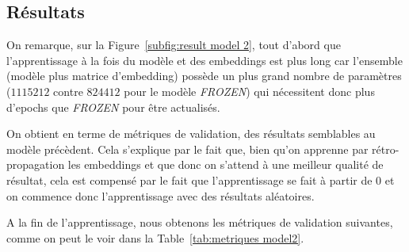 \documentclass[a4paper]{article}
\begin{document}
\subsection{Résultats}


On remarque, sur la Figure~\ref{subfig:result model 2}, tout d'abord que l'apprentissage à la fois du modèle et des embeddings est plus 
long car l'ensemble (modèle plus matrice d'embedding) possède un plus grand nombre de paramètres ($1115212$ contre $824412$ pour le 
modèle \textit{FROZEN}) qui nécessitent donc plus d'epochs que \textit{FROZEN} pour être actualisés.

On obtient en terme de métriques de validation, des résultats semblables au modèle précèdent. Cela s'explique par le fait que, bien 
qu'on apprenne par rétro-propagation les embeddings et que donc on s'attend à une meilleur qualité de résultat, cela est compensé par 
le fait que l'apprentissage se fait à partir de 0 et on commence donc l'apprentissage avec des résultats aléatoires.

A la fin de l'apprentissage, nous obtenons les métriques de validation suivantes, comme on peut le voir dans la 
Table~\ref{tab:metriques model2}.
\end{document}
